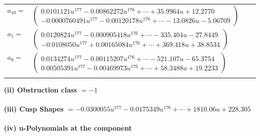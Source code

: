 \documentclass[1p]{elsarticle_modified}
\theoremstyle{definition}
\begin{document}
\begin{tabular}{m{7pt} m{180pt} m{7pt} m{180pt} }
\flushright $a_{10}=$&$\begin{pmatrix}0.0101121 u^{177}-0.00862272 u^{176}+\cdots+35.9964 u+12.2770\\-0.0000760491 u^{177}-0.00120178 u^{176}+\cdots-13.0826 u-5.06709\end{pmatrix}$ \\
\flushright $a_{1}=$&$\begin{pmatrix}0.0120824 u^{177}-0.000905418 u^{176}+\cdots-335.404 u-27.8449\\-0.0108050 u^{177}+0.00165084 u^{176}+\cdots+369.418 u+38.8534\end{pmatrix}$ \\
\flushright $a_{9}=$&$\begin{pmatrix}0.0134274 u^{177}-0.00115207 u^{176}+\cdots-521.107 u-65.3754\\0.00505391 u^{177}-0.00469973 u^{176}+\cdots+58.3488 u+19.2233\end{pmatrix}$\\&\end{tabular}
\flushleft \textbf{(ii) Obstruction class $= -1$}\\~\\
\flushleft \textbf{(iii) Cusp Shapes $= -0.0300055 u^{177}-0.0175349 u^{176}+\cdots+1810.06 u+228.305$}\\~\\
\newpage\renewcommand{\arraystretch}{1}
\flushleft \textbf{(iv) u-Polynomials at the component}\newline \\
\end{document}
